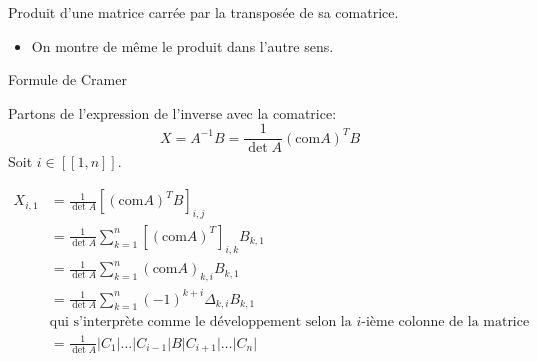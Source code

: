 \documentclass{article}
\begin{document}
\begin{question_kholle}[{Soit $A \in \mathcal{M}_{n}(\K)$.
    Alors $A \times (\mathrm{com} A)^{T} = (\mathrm{com}A)^{T}\times A = \det A \times I_{n}$
    }]{Produit d'une matrice carrée par la transposée de sa comatrice.}
\begin{itemize}[label=$\lozenge$]
\begin{itemize}[label=$\star$]
            Car les lignes d'indice $i$ et $j$ sont identiques.
            Ainsi, pour tout $(i, j) \in [ \! [ 1, n ] \!]^{2}, [A\times(\mathrm{com}A)^{T}]_{i,j}=\delta_{i,j}\times \det A$
            Donc
$$
            [A\times(\mathrm{com}A)^{T}]_{i,j}=\det A\times I_{n}
$$
        \end{itemize}
        \item On montre de même le produit dans l'autre sens.
    \end{itemize}
\end{question_kholle}
\begin{question_kholle}[{  Le système linéaire $AX=B$ d'inconnue $X \in \mathcal{M}_{n,1}(\K)$ et de paramètre $B \in \mathcal{M}_{n,1}(\K)$ est dit "de Cramer" s'il admet une unique solution, à savoir si $A$ est une matrice inversible. Dans ce cas, la solution peut être exprimée explicitement par la formule $A^{-1}B$ qui donne la formule dite de Cramer:
    $$
    \left( \frac{
    \bigg| 
    B\mid C_{2}\mid\dots \mid C_{n}
    \bigg| 
    }{\det A}, \dots, \frac{
    \bigg|
    C_{1} \mid
    \dots \mid
    C_{i-1}\mid
    B \mid
    C_{i+1}\mid
    \dots \mid
    C_{n}
    \bigg|
    }{\det A}, \dots, \frac{
    \bigg| 
    C_{1}\mid C_{2}\mid\dots \mid B
    \bigg| 
    }{\det A} \right)
    $$
    où $(C_{1}, \dots, C_{n}) \in \mathcal{M}_{n,1}(\K)^{n}$ sont les colonnes de $A$.
    }]{Formule de Cramer}
    
    Partons de l'expression de l'inverse avec la comatrice:
    $$X = A^{-1}B= \frac{1}{\det A}(\mathrm{com}A)^{T} B$$
    Soit $i \in [ \! [ 1, n ] \!]$.
    
    \begin{align*}
        X_{i, 1} &= \frac{1}{\det A}[(\mathrm{com}A)^{T}B]_{i,j} \\
        &= \frac{1}{\det A}\sum_{k=1}^{n}[(\mathrm{com}A)^{T}]_{i,k}B_{k,1} \\
        &= \frac{1}{\det A}\sum_{k=1}^{n}(\mathrm{com}A)_{k,i}B_{k, 1} \\
        &= \frac{1}{\det A}\sum_{k=1}^{n}(-1)^{k+i}\Delta_{k,i}B_{k, 1} \\
        &\text{qui s'interprète comme le développement selon la $i$-ième colonne de la matrice} \\
        &= \frac{1}{\det A}\Bigg|C_{1}\Bigg|\dots\Bigg|C_{i-1}\Bigg|B\Bigg|C_{i+1}\Bigg|\dots\Bigg|C_{n}\Bigg|
    \end{align*}
\end{question_kholle}
\end{document}
